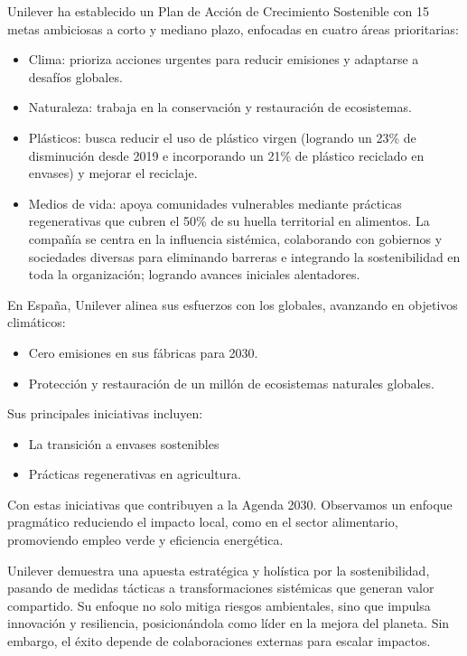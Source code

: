 Unilever ha establecido un Plan de Acción de Crecimiento Sostenible con 15 metas ambiciosas a corto y mediano plazo,
enfocadas en cuatro áreas prioritarias:  \\
\begin{itemize}
	\item Clima: prioriza acciones
		urgentes para reducir emisiones y adaptarse a desafíos globales.
	\item Naturaleza: trabaja en la conservación y restauración 
		de ecosistemas. 
	\item Plásticos: busca reducir el uso de plástico virgen (logrando un 23\% de disminución desde 2019 e
		incorporando un 21\% de plástico reciclado en envases) y mejorar el reciclaje. 
	\item Medios de vida: 
		apoya comunidades vulnerables mediante prácticas regenerativas que cubren el 50\% de su huella 
		territorial en alimentos. La compañía se centra en la influencia sistémica, colaborando con gobiernos y 
		sociedades diversas para eliminando barreras e integrando la sostenibilidad en toda la organización; 
		logrando avances iniciales alentadores.
\end{itemize}

En España, Unilever alinea sus esfuerzos con los globales, avanzando en objetivos climáticos:
\begin{itemize}
	\item Cero emisiones en sus fábricas para 2030.
	\item Protección y restauración de un millón de ecosistemas naturales globales.
\end{itemize}
Sus principales iniciativas incluyen:
\begin{itemize}
	\item La transición a envases sostenibles 
	\item Prácticas regenerativas en agricultura.
\end{itemize} 
Con estas iniciativas que contribuyen a la Agenda 2030. Observamos un enfoque pragmático reduciendo el impacto local, como en 
el sector alimentario, promoviendo empleo verde y eficiencia energética.

Unilever demuestra una apuesta estratégica y holística por la sostenibilidad, pasando de medidas tácticas a transformaciones sistémicas que generan valor compartido. Su enfoque no solo mitiga riesgos ambientales, sino que impulsa innovación y resiliencia, posicionándola como líder en la mejora del planeta. Sin embargo, el éxito depende de colaboraciones externas para escalar impactos.






